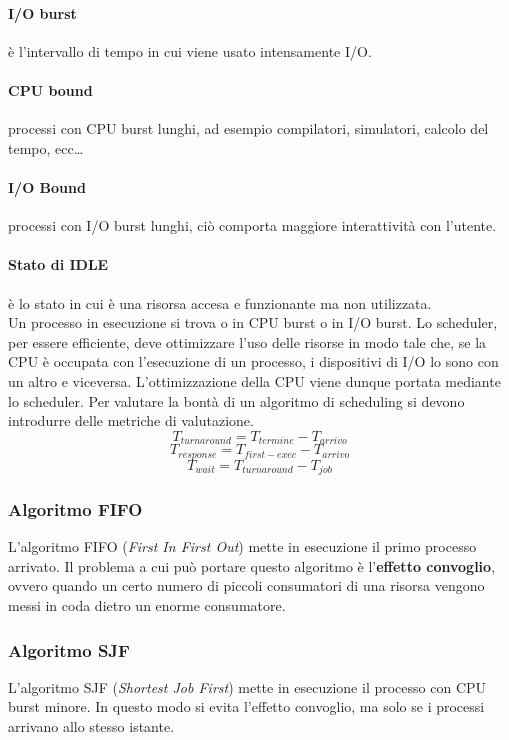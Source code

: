\documentclass[12pt, twoside, letterpaper]{article}
\begin{document}
			\paragraph{I/O burst} è l'intervallo di tempo in cui viene usato intensamente I/O.
			\paragraph{CPU bound} processi con CPU burst lunghi, ad esempio compilatori, simulatori, calcolo del tempo, ecc\dots
			\paragraph{I/O Bound} processi con I/O burst lunghi, ciò comporta maggiore interattività con l'utente.
			\paragraph{Stato di IDLE} è lo stato in cui è una risorsa accesa e funzionante ma non utilizzata. \\	
							
			Un processo in esecuzione si trova o in CPU burst o in I/O burst. 			
			Lo scheduler, per essere efficiente, deve ottimizzare l'uso delle risorse in modo tale che, se la CPU è occupata con l'esecuzione di un processo, i dispositivi di I/O lo sono con un altro e viceversa. L'ottimizzazione della CPU viene dunque portata mediante lo scheduler. Per valutare la bontà di un algoritmo di scheduling si devono introdurre delle metriche di valutazione.
			$$T_{turnaround} = T_{termine} - T_{arrivo}$$
			$$T_{response} = T_{first-exec} - T_{arrivo}$$
			$$T_{wait} = T_{turnaround} - T_{job}$$
				
			\subsubsection{Algoritmo FIFO} 
				L'algoritmo FIFO (\textit{First In First Out}) mette in esecuzione il primo processo arrivato. Il problema a cui può portare questo algoritmo è l'\textbf{effetto convoglio}, ovvero quando un certo numero di piccoli consumatori di una risorsa vengono messi in coda dietro un enorme consumatore. 
				
			\subsubsection{Algoritmo SJF}
				L'algoritmo SJF (\textit{Shortest Job First}) mette in esecuzione il processo con CPU burst minore. In questo modo si evita l'effetto convoglio, ma solo se i processi arrivano allo stesso istante.
					
\end{document}
